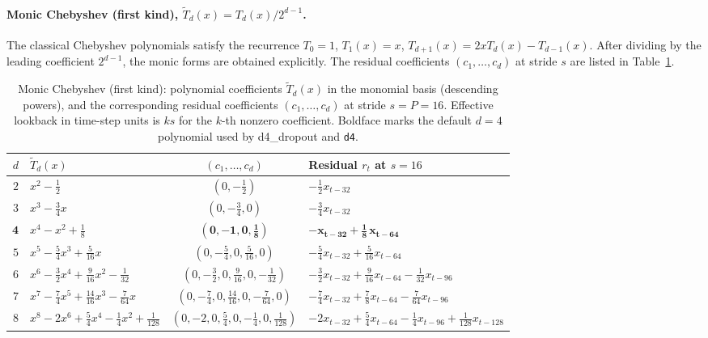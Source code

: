 \documentclass[11pt]{article}
\theoremstyle{plain}
\theoremstyle{definition}
\theoremstyle{remark}
\newcommand{\HD}{\textsf{d4\_dropout}}
\begin{document}
\paragraph{Monic Chebyshev (first kind), $\tilde T_d(x) = T_d(x)/2^{d-1}$.}
The classical Chebyshev polynomials satisfy the recurrence $T_0 = 1$, $T_1(x) = x$, $T_{d+1}(x) = 2x T_d(x) - T_{d-1}(x)$. After dividing by the leading coefficient $2^{d-1}$, the monic forms are obtained explicitly. The residual coefficients $(c_1, \ldots, c_d)$ at stride $s$ are listed in Table~\ref{tab:cheb-coeffs}.

\begin{table}[h]
\centering
\caption{Monic Chebyshev (first kind): polynomial coefficients $\tilde T_d(x)$ in the monomial basis (descending powers), and the corresponding residual coefficients $(c_1, \ldots, c_d)$ at stride $s = P = 16$. Effective lookback in time-step units is $ks$ for the $k$-th nonzero coefficient. Boldface marks the default $d = 4$ polynomial used by \HD{} and \texttt{d4}.}
\label{tab:cheb-coeffs}
\small
\begin{tabular}{rlcl}
\toprule
$d$ & $\tilde T_d(x)$ & $(c_1, \ldots, c_d)$ & Residual $r_t$ at $s = 16$ \\
\midrule
$2$ & $x^2 - \tfrac{1}{2}$                                       & $(0, -\tfrac{1}{2})$                            & $-\tfrac{1}{2} x_{t-32}$ \\
$3$ & $x^3 - \tfrac{3}{4} x$                                     & $(0, -\tfrac{3}{4}, 0)$                         & $-\tfrac{3}{4} x_{t-32}$ \\
$\mathbf{4}$ & $x^4 - x^2 + \tfrac{1}{8}$                        & $\mathbf{(0, -1, 0, \tfrac{1}{8})}$              & $\mathbf{-x_{t-32} + \tfrac{1}{8} \, x_{t-64}}$ \\
$5$ & $x^5 - \tfrac{5}{4} x^3 + \tfrac{5}{16} x$                 & $(0, -\tfrac{5}{4}, 0, \tfrac{5}{16}, 0)$       & $-\tfrac{5}{4} x_{t-32} + \tfrac{5}{16} x_{t-64}$ \\
$6$ & $x^6 - \tfrac{3}{2} x^4 + \tfrac{9}{16} x^2 - \tfrac{1}{32}$ & $(0, -\tfrac{3}{2}, 0, \tfrac{9}{16}, 0, -\tfrac{1}{32})$ & $-\tfrac{3}{2} x_{t-32} + \tfrac{9}{16} x_{t-64} - \tfrac{1}{32} x_{t-96}$ \\
$7$ & $x^7 - \tfrac{7}{4} x^5 + \tfrac{14}{16} x^3 - \tfrac{7}{64} x$ & $(0, -\tfrac{7}{4}, 0, \tfrac{14}{16}, 0, -\tfrac{7}{64}, 0)$ & $-\tfrac{7}{4} x_{t-32} + \tfrac{7}{8} x_{t-64} - \tfrac{7}{64} x_{t-96}$ \\
$8$ & $x^8 - 2 x^6 + \tfrac{5}{4} x^4 - \tfrac{1}{4} x^2 + \tfrac{1}{128}$ & $(0, -2, 0, \tfrac{5}{4}, 0, -\tfrac{1}{4}, 0, \tfrac{1}{128})$ & $-2 x_{t-32} + \tfrac{5}{4} x_{t-64} - \tfrac{1}{4} x_{t-96} + \tfrac{1}{128} x_{t-128}$ \\
\bottomrule
\end{tabular}
\end{table}
\end{document}

